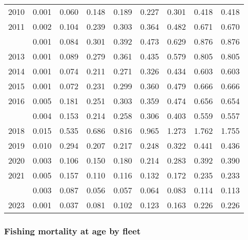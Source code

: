 \documentclass[
]{article}
\begin{document}
\begin{longtable}[t]{lrrrrrrrr}
2010 & 0.001 & 0.060 & 0.148 & 0.189 & 0.227 & 0.301 & 0.418 & 0.418\\
2011 & 0.002 & 0.104 & 0.239 & 0.303 & 0.364 & 0.482 & 0.671 & 0.670\\
\addlinespace
2012 & 0.001 & 0.084 & 0.301 & 0.392 & 0.473 & 0.629 & 0.876 & 0.876\\
2013 & 0.001 & 0.089 & 0.279 & 0.361 & 0.435 & 0.579 & 0.805 & 0.805\\
2014 & 0.001 & 0.074 & 0.211 & 0.271 & 0.326 & 0.434 & 0.603 & 0.603\\
2015 & 0.001 & 0.072 & 0.231 & 0.299 & 0.360 & 0.479 & 0.666 & 0.666\\
2016 & 0.005 & 0.181 & 0.251 & 0.303 & 0.359 & 0.474 & 0.656 & 0.654\\
\addlinespace
2017 & 0.004 & 0.153 & 0.214 & 0.258 & 0.306 & 0.403 & 0.559 & 0.557\\
2018 & 0.015 & 0.535 & 0.686 & 0.816 & 0.965 & 1.273 & 1.762 & 1.755\\
2019 & 0.010 & 0.294 & 0.207 & 0.217 & 0.248 & 0.322 & 0.441 & 0.436\\
2020 & 0.003 & 0.106 & 0.150 & 0.180 & 0.214 & 0.283 & 0.392 & 0.390\\
2021 & 0.005 & 0.157 & 0.110 & 0.116 & 0.132 & 0.172 & 0.235 & 0.233\\
\addlinespace
2022 & 0.003 & 0.087 & 0.056 & 0.057 & 0.064 & 0.083 & 0.114 & 0.113\\
2023 & 0.001 & 0.037 & 0.081 & 0.102 & 0.123 & 0.163 & 0.226 & 0.226\\*
\end{longtable}

\hypertarget{fishing-mortality-at-age-by-fleet}{%
\subsubsection{Fishing mortality at age by
fleet}\label{fishing-mortality-at-age-by-fleet}}
\end{document}
